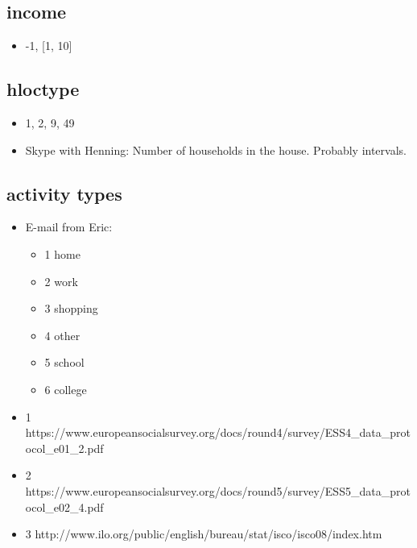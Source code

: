 \documentclass[12pt]{article}
\begin{document}
\subsection{income}
\begin{itemize}
\item -1, [1, 10]
\end{itemize}

\subsection{hloctype}
\begin{itemize}
\item 1, 2, 9, 49
\item Skype with Henning: Number of households in the house. Probably intervals.
\end{itemize}

\subsection{activity types}
\begin{itemize}
\item E-mail from Eric:
\begin{itemize}
\item 1 home
\item 2 work
\item 3 shopping
\item 4 other
\item 5 school
\item 6 college
\end{itemize}
\end{itemize}

\begin{itemize}
\item
1 https://www.europeansocialsurvey.org/docs/round4/survey/ESS4\_data\_protocol\_e01\_2.pdf
\item
2 https://www.europeansocialsurvey.org/docs/round5/survey/ESS5\_data\_protocol\_e02\_4.pdf
\item
3 http://www.ilo.org/public/english/bureau/stat/isco/isco08/index.htm
\end{itemize}
\end{document}
